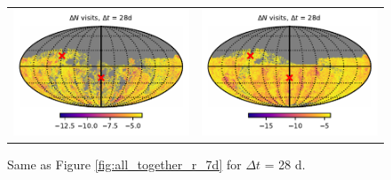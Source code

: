 \documentclass[preprintm,linenumbers]{aastex631}
\begin{document}
\begin{figure}
\begin{tabular}{@{}c@{}c@{}}
         \includegraphics{results/skymaps_cutout/skymaps_cutout_delta_first_year_one_snap_v4_0_10yrs_db_noDD_noTwi_tscale-28_nside-256_doAllTemplateMetrics_reduceCount_g_noDD_noTwi.pdf} &
         \includegraphics{results/skymaps_cutout/skymaps_cutout_delta_first_year_one_snap_v4_0_10yrs_db_noDD_noTwi_tscale-28_nside-256_doAllTemplateMetrics_reduceCount_r_noDD_noTwi.pdf} \\

   \end{tabular}

        \caption{
        Same as Figure \ref{fig:all_together_r_7d} for $\Delta t$ = 28 d. 
        }
        \label{fig:all_together_r_28d}
	\end{figure}

  
\end{document}
